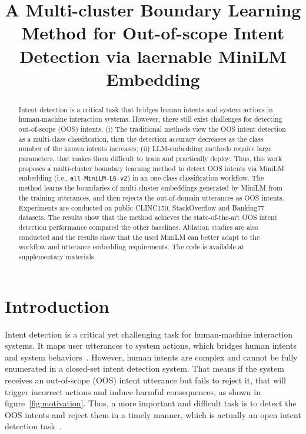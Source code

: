 \documentclass[11pt]{article}
\title{A Multi-cluster Boundary Learning Method for Out-of-scope Intent Detection via laernable MiniLM Embedding}
\begin{document}
\maketitle

\begin{abstract}
Intent detection is a critical task that bridges human intents and system actions in human-machine interaction systems. However, there still exist challenges for detecting out-of-scope (OOS) intents. (i) The traditional methods view the OOS intent detection as a multi-class classification, then the detection accuracy decreases as the class number of the known intents increases; (ii) LLM-embedding methods require large parameters, that makes them difficult to train and practically deploy. Thus, this work proposes a multi-cluster boundary learning method to detect OOS intents via MiniLM embedding (i.e., \texttt{all-MiniLM-L6-v2}) in an one-class classification workflow. The method learns the boundaries of multi-cluster embeddings generated by MiniLM from the training utterances, and then rejects the out-of-domain utterances as OOS intents. Experiments are conducted on public CLINC150, StackOverflow and Banking77 datasets. The results show that the method achieves the state-of-the-art OOS intent detection performance compared the other baselines. Ablation studies are also conducted and the results show that the used MiniLM can better adapt to the workflow and utterance embedding requirements. The code is available at supplementary materials.
\end{abstract}

\section{Introduction}
Intent detection is a critical yet challenging task for human-machine interaction systems. It maps user utterances to system actions, which bridges human intents and system behaviors~\citep{tur2010what,louvan2020recent,wolflein2025agents}. However, human intents are complex and cannot be fully enumerated in a closed-set intent detection system. That means if the system receives an out-of-scope (OOS) intent utterance but fails to reject it, that will trigger incorrect actions and induce harmful consequences, as shown in figure~\ref{fig:motivation}. Thus, a more important and difficult task is to detect the OOS intents and reject them in a timely manner, which is actually an open intent detection task~\citep{hoffman2024inferring, muzahid2024survey}.
\end{document}
